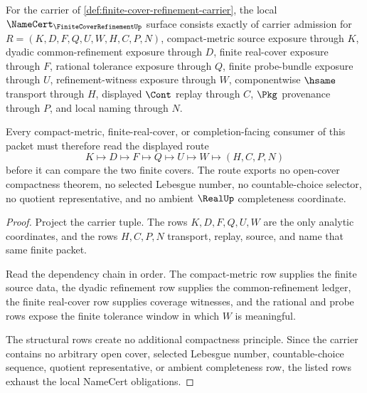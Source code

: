 \begin{theorem}
\label{thm:finite-cover-refinement-namecert-obligations}
For the carrier of \autoref{def:finite-cover-refinement-carrier}, the local $\NameCert_{\FiniteCoverRefinementUp}$ surface consists exactly of carrier admission for $R=(K,D,F,Q,U,W,H,C,P,N)$, compact-metric source exposure through $K$, dyadic common-refinement exposure through $D$, finite real-cover exposure through $F$, rational tolerance exposure through $Q$, finite probe-bundle exposure through $U$, refinement-witness exposure through $W$, componentwise $\hsame$ transport through $H$, displayed $\Cont$ replay through $C$, $\Pkg$ provenance through $P$, and local naming through $N$.

Every compact-metric, finite-real-cover, or completion-facing consumer of this packet must therefore read the displayed route
$$
K\longmapsto D\longmapsto F\longmapsto Q\longmapsto U\longmapsto W\longmapsto(H,C,P,N)
$$
before it can compare the two finite covers. The route exports no open-cover compactness theorem, no selected Lebesgue number, no countable-choice selector, no quotient representative, and no ambient $\RealUp$ completeness coordinate.
\end{theorem}
\begin{proof}
Project the carrier tuple. The rows $K,D,F,Q,U,W$ are the only analytic coordinates, and the rows $H,C,P,N$ transport, replay, source, and name that same finite packet.

Read the dependency chain in order. The compact-metric row supplies the finite source data, the dyadic refinement row supplies the common-refinement ledger, the finite real-cover row supplies coverage witnesses, and the rational and probe rows expose the finite tolerance window in which $W$ is meaningful.

The structural rows create no additional compactness principle. Since the carrier contains no arbitrary open cover, selected Lebesgue number, countable-choice sequence, quotient representative, or ambient completeness row, the listed rows exhaust the local NameCert obligations.
\end{proof}

